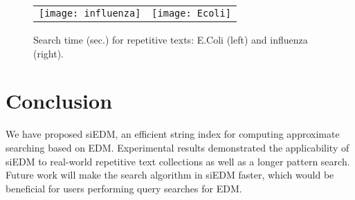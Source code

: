 \documentclass[12pt,a4paper]{scrartcl}
\begin{document}
\begin{figure}[t]
\begin{center}
\begin{tabular}{cc}
\hspace{1.5cm}
\texttt{[image: influenza]} &
\texttt{[image: Ecoli]}
\end{tabular}
\end{center}
\vspace{1.5cm}
\caption{Search time (sec.) for repetitive texts:
E.Coli (left) and influenza (right).
}
\label{extra}
\end{figure}



\section{Conclusion}

We have proposed siEDM, an efficient string index for computing approximate
searching based on EDM.  Experimental results demonstrated the applicability
of siEDM to real-world repetitive text collections as well as a longer pattern
search.  Future work will make the search algorithm in siEDM faster, which
would be beneficial for users performing query searches for EDM.




\end{document}
